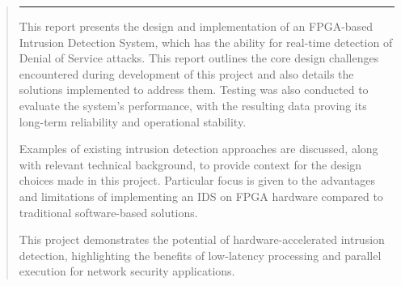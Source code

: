 \begin{abstract}
        \rule{0.9\textwidth}{0.4pt} %
\noindent %

This report presents the design and implementation of an FPGA-based Intrusion Detection System, which has the ability for real-time detection of Denial of Service attacks. This report outlines the core design challenges encountered during development of this project and also details the solutions implemented to address them. Testing was also conducted to evaluate the system's performance, with the resulting data proving its long-term reliability and operational stability.

\vspace{1em} 
Examples of existing intrusion detection approaches are discussed, along with
relevant technical background, to provide context for the design choices made
in this project. Particular focus is given to the advantages and limitations of
implementing an IDS on FPGA hardware compared to traditional software-based
solutions.


\vspace{1em}
This project demonstrates the potential of hardware-accelerated intrusion
detection, highlighting the benefits of low-latency processing and parallel
execution for network security applications.
\end{abstract}

